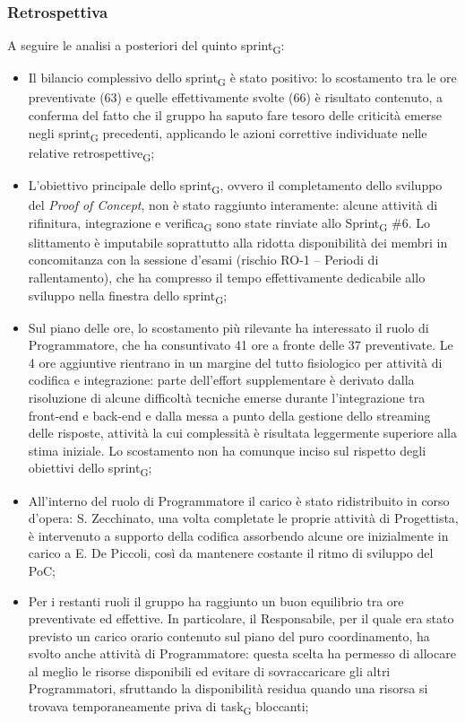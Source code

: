 ﻿\documentclass[a4paper, 10pt, colorlinks=true, linkcolor=black, urlcolor=blue, citecolor=blue, hidelinks]{article}
\begin{document}
\subsubsection{Retrospettiva}
A seguire le analisi a posteriori del quinto sprint\textsubscript{G}:
\begin{itemize}
    \item Il bilancio complessivo dello sprint\textsubscript{G} è stato positivo: lo scostamento tra le ore preventivate (63) e quelle effettivamente svolte (66) è risultato contenuto, a conferma del fatto che il gruppo ha saputo fare tesoro delle criticità emerse negli sprint\textsubscript{G} precedenti, applicando le azioni correttive individuate nelle relative retrospettive\textsubscript{G};
    \item L'obiettivo principale dello sprint\textsubscript{G}, ovvero il completamento dello sviluppo del \textit{Proof of Concept}, non è stato raggiunto interamente: alcune attività di rifinitura, integrazione e verifica\textsubscript{G} sono state rinviate allo Sprint\textsubscript{G} \#6. Lo slittamento è imputabile soprattutto alla ridotta disponibilità dei membri in concomitanza con la sessione d'esami (rischio RO-1 -- Periodi di rallentamento), che ha compresso il tempo effettivamente dedicabile allo sviluppo nella finestra dello sprint\textsubscript{G};
    \item Sul piano delle ore, lo scostamento più rilevante ha interessato il ruolo di Programmatore, che ha consuntivato 41 ore a fronte delle 37 preventivate. Le 4 ore aggiuntive rientrano in un margine del tutto fisiologico per attività di codifica e integrazione: parte dell'effort supplementare è derivato dalla risoluzione di alcune difficoltà tecniche emerse durante l'integrazione tra front-end e back-end e dalla messa a punto della gestione dello streaming delle risposte, attività la cui complessità è risultata leggermente superiore alla stima iniziale. Lo scostamento non ha comunque inciso sul rispetto degli obiettivi dello sprint\textsubscript{G};
    \item All'interno del ruolo di Programmatore il carico è stato ridistribuito in corso d'opera: S. Zecchinato, una volta completate le proprie attività di Progettista, è intervenuto a supporto della codifica assorbendo alcune ore inizialmente in carico a E. De Piccoli, così da mantenere costante il ritmo di sviluppo del PoC;
    \item Per i restanti ruoli il gruppo ha raggiunto un buon equilibrio tra ore preventivate ed effettive. In particolare, il Responsabile, per il quale era stato previsto un carico orario contenuto sul piano del puro coordinamento, ha svolto anche attività di Programmatore: questa scelta ha permesso di allocare al meglio le risorse disponibili ed evitare di sovraccaricare gli altri Programmatori, sfruttando la disponibilità residua quando una risorsa si trovava temporaneamente priva di task\textsubscript{G} bloccanti;

\end{itemize}
\end{document}
